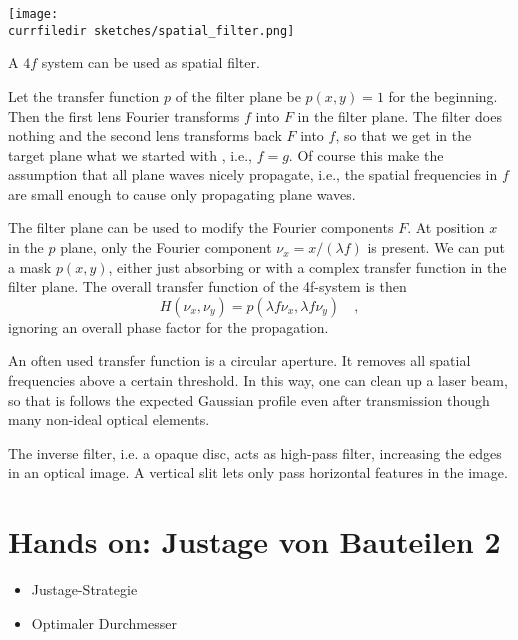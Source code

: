 \begin{marginfigure}
    \texttt{[image: \\currfiledir sketches/spatial\_filter.png]}
    \caption{A $4f$ system can be used as spatial filter.}
\end{marginfigure}

Let the transfer function $p$ of the filter plane be $p(x,y)=1$ for the beginning. Then the first lens Fourier transforms $f$ into $F$ in the filter plane. The filter does nothing and the second lens transforms back $F$ into $f$, so that we get in the target plane what we started with , i.e., $f=g$. Of course this make the assumption that all plane waves nicely propagate, i.e., the spatial frequencies in $f$ are small enough to cause only propagating plane waves.

The filter plane can be used to modify the Fourier components $F$. At position $x$ in the $p$ plane, only the Fourier component $\nu_x = x / (\lambda f)$ is present. We can put a mask $p(x,y)$, either just absorbing or with a complex transfer function in the filter plane. The overall transfer function of the 4f-system is then
\begin{equation}
    H(\nu_x, \nu_y) = p (\lambda f \nu_x, \lambda f \nu_y) \quad , 
\end{equation}
ignoring an overall phase factor for the propagation. 

An often used transfer function is a circular aperture. It removes all spatial frequencies above a certain threshold. In this way, one can clean up a laser beam, so that is follows the expected Gaussian profile even after transmission though many non-ideal optical elements.

The inverse filter, i.e. a opaque disc, acts as high-pass filter, increasing the edges in an optical image. A vertical slit lets only pass horizontal features in the image.



\section{Hands on: Justage von Bauteilen 2}

\begin{itemize}

\item {Justage-Strategie}
\item {Optimaler Durchmesser}
\end{itemize}



\printbibliography[segment=\therefsegment,heading=subbibliography]
